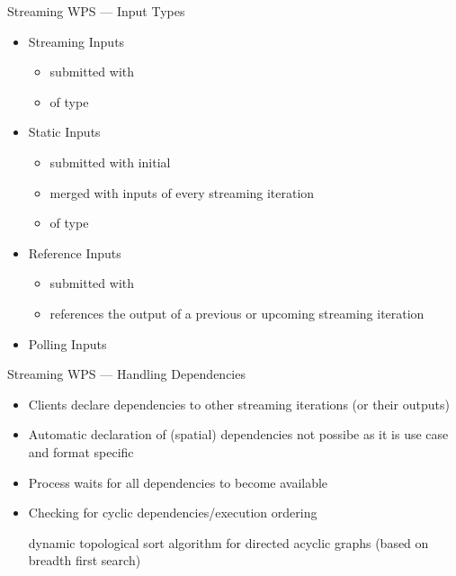 \documentclass[xcolor=svgnames,professionalfonts,11pt,aspectratio=43]{beamer}
\begin{document}
\begin{frame}{Streaming WPS --- Input Types}
  \begin{itemize}
    \item Streaming Inputs
    \begin{itemize}
      \item submitted with 
      \item of type 
    \end{itemize}
    \pause
    \item Static Inputs
    \begin{itemize}
      \item submitted with initial 
      \item merged with inputs of every streaming iteration
      \item of type 
    \end{itemize}
    \pause
    \item Reference Inputs
    \begin{itemize}
      \item submitted with 
      \item references the output of a previous or upcoming streaming iteration
    \end{itemize}
    \pause
    \item Polling Inputs
  \end{itemize}
\end{frame}

\begin{frame}[t]{Streaming WPS --- Handling Dependencies}
  \begin{itemize}
    \item Clients declare dependencies to other streaming iterations (or their outputs)
    \item Automatic declaration of (spatial) dependencies not possibe as it is use case and format specific
    \item Process waits for all dependencies to become available
    \item Checking for cyclic dependencies/execution ordering
    \pause
    \begin{itemize}
      \arrow dynamic topological sort algorithm for directed acyclic graphs (based on breadth first search)
    \end{itemize}
  \end{itemize}
\end{frame}
\end{document}
